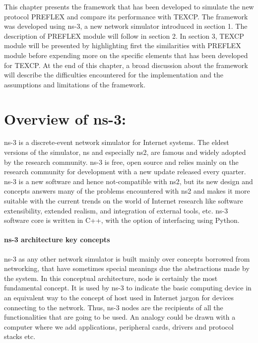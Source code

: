 This chapter presents the framework that has been developed to simulate the new protocol PREFLEX and compare its performance with TEXCP. The framework was developed using ns-3, a new network simulator introduced in section 1. The description of PREFLEX module will follow in section 2. In section 3, TEXCP module will be presented by highlighting first the similarities with PREFLEX module before expending more on the specific elements that has been developed for TEXCP. At the end of this chapter, a broad discussion about the framework will describe the difficulties encountered for the implementation and the assumptions and limitations of the framework.

\section{Overview of ns-3:}

ns-3 is a discrete-event network simulator for Internet systems. The eldest versions of the simulator, ns and especially ns2, are famous and widely adopted by the research community.  ns-3  is free, open source and relies mainly on the research community for development with a new update released every quarter. ns-3 is a new software and hence not-compatible with ns2, but its new design and concepts answers many of the problems encountered with ns2 and makes it more suitable with the current trends on the world of Internet research like software extensibility, extended realism, and integration of external tools, etc.  ns-3 software core is written in C++, with the option of interfacing using Python. 

\paragraph{ns-3 architecture key concepts}

ns-3 as any other network simulator is built mainly over concepts borrowed from networking, that  have sometimes special meanings due the abstractions made by the system. In this conceptual architecture, node is certainly the most fundamental concept. It is used by ns-3 to indicate the basic computing device in an  equivalent way to the concept of host used in Internet jargon for devices connecting to the network. Thus, ns-3 nodes are the recipients of all the functionalities that are going to be used. An analogy could be drawn with a computer where we add applications, peripheral cards, drivers and protocol stacks etc. 

